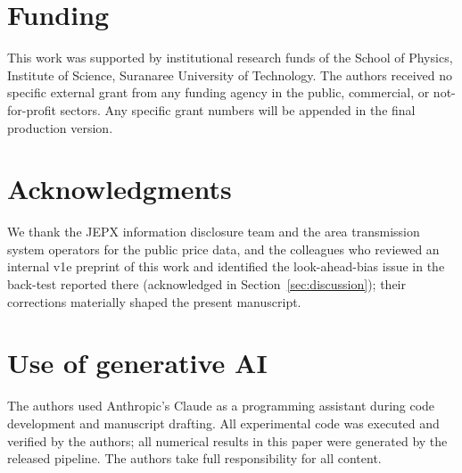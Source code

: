 \documentclass[review,3p,times,authoryear]{elsarticle}
\begin{document}
\section*{Funding}
This work was supported by institutional research funds of the School of Physics, Institute of Science, Suranaree University of Technology. The authors received no specific external grant from any funding agency in the public, commercial, or not-for-profit sectors. Any specific grant numbers will be appended in the final production version.

\section*{Acknowledgments}
We thank the JEPX information disclosure team and the area transmission system operators for the public price data, and the colleagues who reviewed an internal v1e preprint of this work and identified the look-ahead-bias issue in the back-test reported there (acknowledged in Section~\ref{sec:discussion}); their corrections materially shaped the present manuscript.

\section*{Use of generative AI}
The authors used Anthropic's Claude as a programming assistant during code development and manuscript drafting. All experimental code was executed and verified by the authors; all numerical results in this paper were generated by the released pipeline. The authors take full responsibility for all content.



\end{document}
